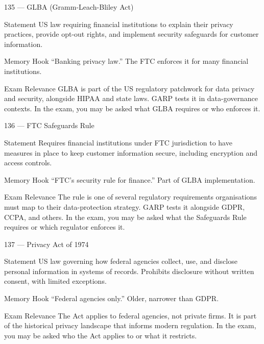 \documentclass[aspectratio=169,8pt]{beamer}
\begin{document}
	\begin{frame}{135 --- GLBA (Gramm-Leach-Bliley Act)}
		\begin{block}{Statement}
			US law requiring financial institutions to explain their privacy practices, provide opt-out rights, and implement security safeguards for customer information.
		\end{block}
		\begin{block}{Memory Hook}
			``Banking privacy law.'' The FTC enforces it for many financial institutions.
		\end{block}
		\begin{block}{Exam Relevance}
			GLBA is part of the US regulatory patchwork for data privacy and security, alongside HIPAA and state laws. GARP tests it in data-governance contexts. In the exam, you may be asked what GLBA requires or who enforces it.
		\end{block}
	\end{frame}
	
	\begin{frame}{136 --- FTC Safeguards Rule}
		\begin{block}{Statement}
			Requires financial institutions under FTC jurisdiction to have measures in place to keep customer information secure, including encryption and access controls.
		\end{block}
		\begin{block}{Memory Hook}
			``FTC's security rule for finance.'' Part of GLBA implementation.
		\end{block}
		\begin{block}{Exam Relevance}
			The rule is one of several regulatory requirements organisations must map to their data-protection strategy. GARP tests it alongside GDPR, CCPA, and others. In the exam, you may be asked what the Safeguards Rule requires or which regulator enforces it.
		\end{block}
	\end{frame}
	
	\begin{frame}{137 --- Privacy Act of 1974}
		\begin{block}{Statement}
			US law governing how federal agencies collect, use, and disclose personal information in systems of records. Prohibits disclosure without written consent, with limited exceptions.
		\end{block}
		\begin{block}{Memory Hook}
			``Federal agencies only.'' Older, narrower than GDPR.
		\end{block}
		\begin{block}{Exam Relevance}
			The Act applies to federal agencies, not private firms. It is part of the historical privacy landscape that informs modern regulation. In the exam, you may be asked who the Act applies to or what it restricts.
		\end{block}
	\end{frame}
	
\end{document}
